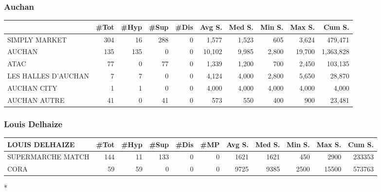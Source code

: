 \documentclass[11pt]{article}
\begin{document}
\subsubsection{Auchan}

\begin{table}[H]
\footnotesize
\setlength{\tabcolsep}{2pt}

\begin{tabular}{lrrrrrrrrr}
\toprule
{} &       \#Tot &       \#Hyp &       \#Sup &       \#Dis &     Avg S. &     Med S. &     Min S. &     Max S. &     Cum S. \\
\midrule
SIMPLY MARKET       &        304 &         16 &        288 &          0 &      1,577 &      1,523 &        605 &      3,624 &    479,471 \\
AUCHAN              &        135 &        135 &          0 &          0 &     10,102 &      9,985 &      2,800 &     19,700 &  1,363,828 \\
ATAC                &         77 &          0 &         77 &          0 &      1,339 &      1,200 &        700 &      2,450 &    103,135 \\
LES HALLES D'AUCHAN &          7 &          7 &          0 &          0 &      4,124 &      4,000 &      2,800 &      5,650 &     28,870 \\
AUCHAN CITY         &          1 &          1 &          0 &          0 &      4,000 &      4,000 &      4,000 &      4,000 &      4,000 \\
AUCHAN AUTRE        &         41 &          0 &         41 &          0 &        573 &        550 &        400 &        900 &     23,481 \\
\bottomrule
\end{tabular}

\end{table}


\subsubsection{Louis Delhaize}

\begin{table}[H]
\footnotesize
\setlength{\tabcolsep}{2pt}

\begin{tabular}{lrrrrrrrrrr}
\toprule
LOUIS DELHAIZE &       \#Tot &       \#Hyp &       \#Sup &       \#Dis &        \#MP &     Avg S. &     Med S. &     Min S. &     Max S. &     Cum S. \\
\midrule
SUPERMARCHE MATCH &        144 &         11 &        133 &          0 &          0 &       1621 &       1621 &        450 &       2900 &     233353 \\
CORA              &         59 &         59 &          0 &          0 &          0 &       9725 &       9385 &       2500 &      15500 &     573763 \\
\bottomrule
\end{tabular}*
\end{table}
\end{document}
